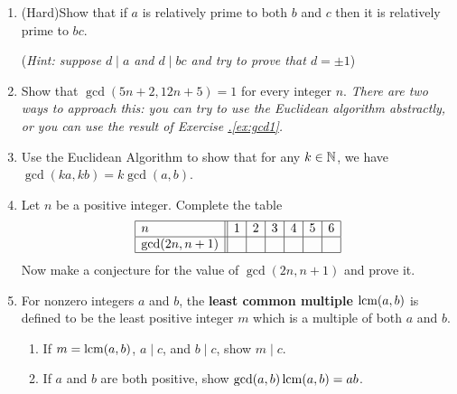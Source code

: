 \begin{exercises}{}{}
\begin{enumerate}
    
    \item (Hard)\lstsp Show that if $a$ is relatively prime to both $b$ and $c$ then it is relatively prime to $bc$.\par
    (\emph{Hint: suppose $d\mid a$ and $d\mid bc$ and try to prove that $d=\pm 1$})
%   

  
  \item Show that $\gcd(5n+2,12n+5)=1$ for every integer $n$. \emph{There are two ways to approach this: you can try to use the Euclidean algorithm abstractly, or you can use the result of Exercise \hyperref[ex:gcd1]{\thesubsection.\ref*{ex:gcd1}}.}
  
  
  \item Use the Euclidean Algorithm to show that for any $k \in \mathbb{N}$, we have $\gcd(ka,kb) = k \gcd(a,b)$.
  
  
  \item Let $n$ be a positive integer. Complete the table
  \[\begin{array}{|l||c|c|c|c|c|c|}
  \hline
  n&1&2&3&4&5&6\\\hline
  \gcd(2n,n+1)&&&&&&\\\hline
  \end{array}\]
  Now make a conjecture for the value of $\gcd(2n,n+1)$ and prove it.
  
  
    
    \item For nonzero integers $a$ and $b$, the \textbf{least common multiple} $\operatorname{lcm}(a,b)$ is defined to be the least positive integer $m$ which is a multiple of both $a$ and $b$.
    \begin{enumerate}
        \item If $m = \operatorname{lcm}(a,b)$, $a \mid c$, and $b \mid c$, show $m \mid c$.
        \item If $a$ and  $b$ are both positive, show $\gcd(a,b) \operatorname{lcm}(a,b) = ab$.
    \end{enumerate}
  

\end{enumerate}
\end{exercises}

